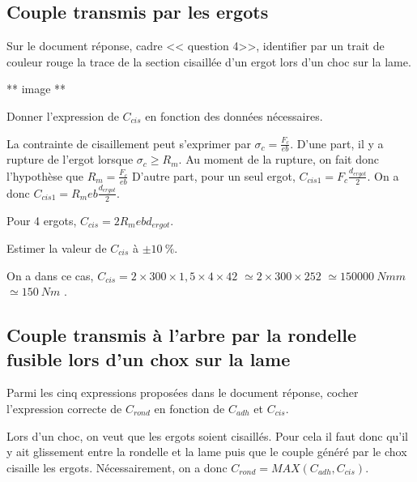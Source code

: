 \documentclass[11pt]{article}
\begin{document}
\subsection{Couple transmis par les ergots}

\UPSTIquestion* Sur le document réponse, cadre << question  4>>, identifier par un trait de couleur rouge la trace de la section cisaillée d'un ergot lors d'un choc sur la lame.

\begin{UPSTIcorrige}
** image ** 
\end{UPSTIcorrige}

\UPSTIquestion Donner l'expression de $C_{cis}$ en fonction des données nécessaires. 

\begin{UPSTIcorrige}
La contrainte de cisaillement peut s'exprimer par $\sigma_c = \frac{F_c}{eb}$.
D'une part, il y a rupture de l'ergot lorsque $\sigma_c \geq R_m$. Au moment de la rupture, on fait donc l'hypothèse que
$R_m = \frac{F_c}{eb}$
D'autre part, pour un seul ergot, $C_{cis1} = F_c \frac{d_{ergot}}{2}$.
On a donc $C_{cis1} = R_m e b \frac{d_{ergot}}{2}$. 

Pour 4 ergots, $C_{cis} = 2R_m e b d_{ergot}$. 
\end{UPSTIcorrige}

\UPSTIquestion Estimer la valeur de $C_{cis}$ à  $\pm\SI{10}{\%}$.

\begin{UPSTIcorrige}
On a dans ce cas, $C_{cis} = 2 \times 300 \times 1,5 \times  4 \times 42$
$ \simeq 2 \times 300 \times 252$ $ \simeq \SI{150000}{Nmm}$ $\simeq \SI{150}{Nm}$ .

\end{UPSTIcorrige}

\subsection{Couple transmis à l'arbre par la rondelle fusible lors d'un chox sur la lame}
\UPSTIquestion* Parmi les cinq expressions proposées dans le document réponse, cocher l'expression correcte de $C_{rond}$ en fonction de 
$C_{adh}$ et $C_{cis}$.

\begin{UPSTIcorrige}
Lors d'un choc, on veut que les ergots soient cisaillés. Pour cela il faut donc qu'il y ait glissement entre la rondelle et la lame puis que le couple généré par le chox cisaille les ergots. 
Nécessairement, on a donc $C_{rond}=MAX\left(C_{adh},C_{cis}\right)$.
\end{UPSTIcorrige}
\end{document}
